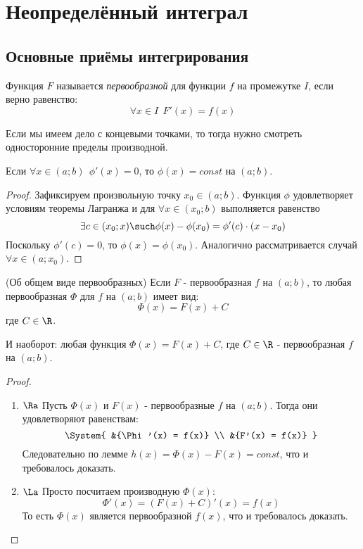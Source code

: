 \section{Неопределённый интеграл}

\subsection{Основные приёмы интегрирования}

\begin{definition}
	Функция $F$ называется \textit{первообразной} для функции $f$ на промежутке $I$, если верно равенство:
	\[
		\forall x \in I\ \ F'(x) = f(x)
	\]
\end{definition}

\begin{note}
	Если мы имеем дело с концевыми точками, то тогда нужно смотреть односторонние пределы производной.
\end{note}

\begin{lemma}
	Если $\forall x \in (a; b)\ \ \phi'(x) = 0$, то $\phi(x) = const$ на $(a; b)$.
\end{lemma}

\begin{proof}
	Зафиксируем произвольную точку $x_0 \in (a; b)$. Функция $\phi$ удовлетворяет условиям теоремы Лагранжа и для $\forall x \in (x_0; b)$ выполняется равенство
	\[
		\exists c \in (x_0; x) \such \phi(x) - \phi(x_0) = \phi'(c) \cdot (x - x_0)
	\]
	Поскольку $\phi'(c) = 0$, то $\phi(x) = \phi(x_0)$. Аналогично рассматривается случай $\forall x \in (a; x_0)$.
\end{proof}

\begin{theorem} (Об общем виде первообразных)
	Если $F$ - первообразная $f$ на $(a; b)$, то любая первообразная $\Phi$ для $f$ на $(a; b)$ имеет вид:
	\[
		\Phi(x) = F(x) + C
	\]
	где $C \in \R$.
	
	И наоборот: любая функция $\Phi(x) = F(x) + C$, где $C \in \R$ - первообразная $f$ на $(a; b)$.
\end{theorem}

\begin{proof}~
	\begin{enumerate}
		\item $\Ra$ Пусть $\Phi(x)$ и $F(x)$ - первообразные $f$ на $(a; b)$. Тогда они удовлетворяют равенствам:
		\[
			\System{
				&{\Phi'(x) = f(x)}
				\\
				&{F'(x) = f(x)}
			}
		\]
		Следовательно по лемме $h(x) = \Phi(x) - F(x) = const$, что и требовалось доказать.
		
		\item $\La$ Просто посчитаем производную $\Phi(x)$:
		\[
			\Phi'(x) = (F(x) + C)'(x) = f(x)
		\]
		То есть $\Phi(x)$ является первообразной $f(x)$, что и требовалось доказать.
	\end{enumerate}
\end{proof}